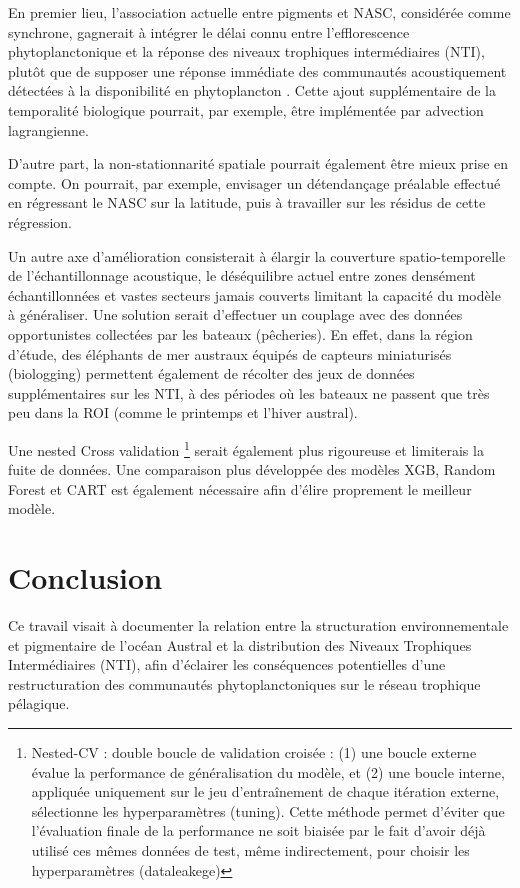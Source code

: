 \documentclass[11pt,a4paper,oneside]{report}
\begin{document}
	
	En premier lieu, l'association actuelle entre pigments et NASC, considérée comme synchrone, gagnerait à intégrer le délai connu entre l'efflorescence phytoplanctonique et la réponse des niveaux trophiques intermédiaires (NTI), plutôt que de supposer une réponse immédiate des communautés acoustiquement détectées à la disponibilité en phytoplancton \cite{boyce2017environmental}. Cette ajout supplémentaire de la temporalité biologique pourrait, par exemple, être implémentée par advection lagrangienne.
	
	D'autre part, la non-stationnarité spatiale pourrait également être mieux prise en compte. On pourrait, par exemple, envisager un détendançage préalable effectué en régressant le NASC sur la latitude, puis à travailler sur les résidus de cette régression.
	
	Un autre axe d'amélioration consisterait à élargir la couverture spatio-temporelle de l'échantillonnage acoustique, le déséquilibre actuel entre zones densément échantillonnées et vastes secteurs jamais couverts limitant la capacité du modèle à généraliser. Une solution serait d'effectuer un couplage avec des données opportunistes collectées par les bateaux (pêcheries). En effet, dans la région d'étude, des éléphants de mer austraux équipés de capteurs miniaturisés (biologging) permettent également de récolter des jeux de données supplémentaires sur les NTI, à des périodes où les bateaux ne passent que très peu dans la ROI (comme le printemps et l'hiver austral).
	
	Une nested Cross validation \footnote{Nested-CV : double boucle de validation croisée : (1) une boucle externe évalue la performance de généralisation du modèle, et (2) une boucle interne, appliquée uniquement sur le jeu d'entraînement de chaque itération externe, sélectionne les hyperparamètres (tuning). Cette méthode permet d'éviter que l'évaluation finale de la performance ne soit biaisée par le fait d'avoir déjà utilisé ces mêmes données de test, même indirectement, pour choisir les hyperparamètres (dataleakege)}  serait également plus rigoureuse et limiterais la fuite de données. Une comparaison plus développée des modèles XGB, Random Forest et CART est également nécessaire afin d'élire proprement le meilleur modèle. 
	
	
	
	
	
	\clearpage
	\chapter{Conclusion}
	Ce travail visait à documenter la relation entre la structuration environnementale et pigmentaire de l'océan Austral et la distribution des Niveaux Trophiques Intermédiaires (NTI), afin d'éclairer les conséquences potentielles d'une restructuration des communautés phytoplanctoniques sur le réseau trophique pélagique.
	
\end{document}
